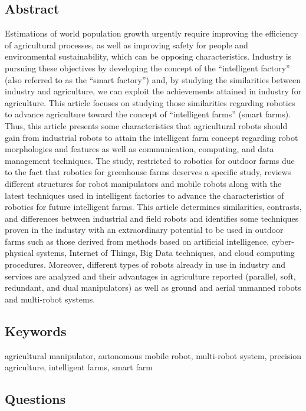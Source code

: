 \subsection*{Abstract}
Estimations of world population growth urgently require improving the efficiency of
agricultural processes, as well as improving safety for people and environmental sustainability,
which can be opposing characteristics. Industry is pursuing these objectives by developing the
concept of the “intelligent factory” (also referred to as the “smart factory”) and, by studying the
similarities between industry and agriculture, we can exploit the achievements attained in industry
for agriculture. This article focuses on studying those similarities regarding robotics to advance
agriculture toward the concept of “intelligent farms” (smart farms). Thus, this article presents some
characteristics that agricultural robots should gain from industrial robots to attain the intelligent farm
concept regarding robot morphologies and features as well as communication, computing, and data
management techniques. The study, restricted to robotics for outdoor farms due to the fact that robotics
for greenhouse farms deserves a specific study, reviews different structures for robot manipulators and
mobile robots along with the latest techniques used in intelligent factories to advance the characteristics
of robotics for future intelligent farms. This article determines similarities, contrasts, and differences
between industrial and field robots and identifies some techniques proven in the industry with an
extraordinary potential to be used in outdoor farms such as those derived from methods based on
artificial intelligence, cyber-physical systems, Internet of Things, Big Data techniques, and cloud
computing procedures. Moreover, different types of robots already in use in industry and services
are analyzed and their advantages in agriculture reported (parallel, soft, redundant, and dual
manipulators) as well as ground and aerial unmanned robots and multi-robot systems.

\subsection*{Keywords}
agricultural manipulator, autonomous mobile robot, multi-robot system, precision agriculture, intelligent farms, smart farm

\subsection*{Questions}
